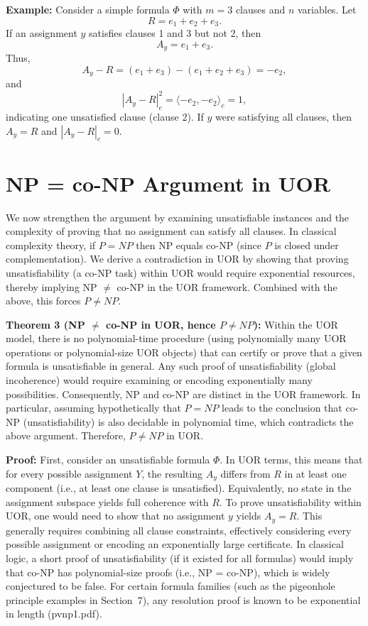\documentclass{article}
\begin{document}
\medskip
\textbf{Example:} Consider a simple formula $\Phi$ with $m=3$ clauses and $n$ variables. Let 
\[
R = e_1 + e_2 + e_3.
\]
If an assignment $y$ satisfies clauses 1 and 3 but not 2, then
\[
A_y = e_1 + e_3.
\]
Thus,
\[
A_y - R = (e_1 + e_3) - (e_1+e_2+e_3) = -e_2,
\]
and 
\[
|A_y - R|_c^2 = \langle -e_2, -e_2 \rangle_c = 1,
\]
indicating one unsatisfied clause (clause 2). If $y$ were satisfying all clauses, then $A_y = R$ and $|A_y - R|_c = 0$.

\section{NP = co-NP Argument in UOR}

We now strengthen the argument by examining unsatisfiable instances and the complexity of proving that no assignment can satisfy all clauses. In classical complexity theory, if $P=NP$ then NP equals co-NP (since $P$ is closed under complementation). We derive a contradiction in UOR by showing that proving unsatisfiability (a co-NP task) within UOR would require exponential resources, thereby implying NP $\neq$ co-NP in the UOR framework. Combined with the above, this forces $P \neq NP$.

\medskip
\textbf{Theorem 3 (NP $\neq$ co-NP in UOR, hence $P \neq NP$):} Within the UOR model, there is no polynomial-time procedure (using polynomially many UOR operations or polynomial-size UOR objects) that can certify or prove that a given formula is unsatisfiable in general. Any such proof of unsatisfiability (global incoherence) would require examining or encoding exponentially many possibilities. Consequently, NP and co-NP are distinct in the UOR framework. In particular, assuming hypothetically that $P=NP$ leads to the conclusion that co-NP (unsatisfiability) is also decidable in polynomial time, which contradicts the above argument. Therefore, $P \neq NP$ in UOR.

\medskip
\textbf{Proof:} First, consider an unsatisfiable formula $\Phi$. In UOR terms, this means that for every possible assignment $Y$, the resulting $A_y$ differs from $R$ in at least one component (i.e., at least one clause is unsatisfied). Equivalently, no state in the assignment subspace yields full coherence with $R$. To prove unsatisfiability within UOR, one would need to show that no assignment $y$ yields $A_y = R$. This generally requires combining all clause constraints, effectively considering every possible assignment or encoding an exponentially large certificate. In classical logic, a short proof of unsatisfiability (if it existed for all formulas) would imply that co-NP has polynomial-size proofs (i.e., NP = co-NP), which is widely conjectured to be false. For certain formula families (such as the pigeonhole principle examples in Section~7), any resolution proof is known to be exponential in length (pvnp1.pdf).
\end{document}
